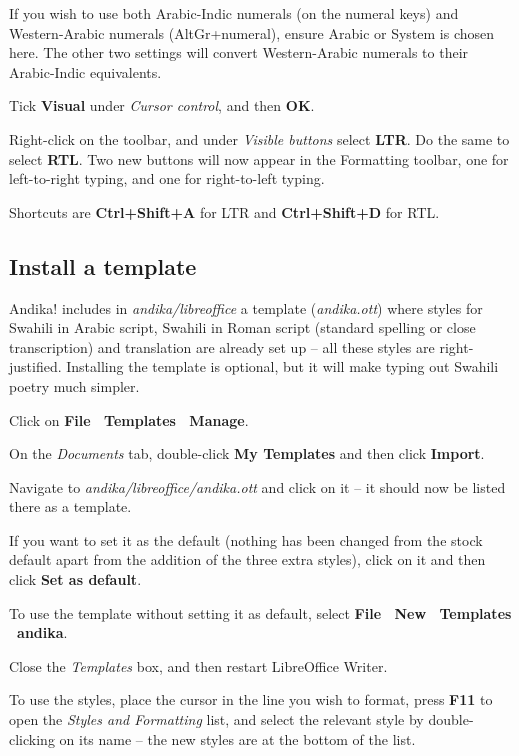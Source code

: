 If you wish to use both Arabic-Indic numerals (on the numeral keys) and Western-Arabic numerals (AltGr+numeral), ensure Arabic or System is chosen here. The other two settings will convert Western-Arabic numerals to their Arabic-Indic equivalents.

Tick \textbf{Visual} under \textit{Cursor control}, and then \textbf{OK}.

Right-click on the toolbar, and under \textit{Visible buttons} select \textbf{LTR}.  Do the same to select \textbf{RTL}.  Two new buttons will now appear in the Formatting toolbar, one for left-to-right typing, and one for right-to-left typing.

Shortcuts are \textbf{Ctrl+Shift+A} for LTR and \textbf{Ctrl+Shift+D} for RTL.

\subsection{Install a template}

Andika! includes in \textit{andika/libreoffice} a template (\textit{andika.ott}) where styles for Swahili in Arabic script, Swahili in Roman script (standard spelling or close transcription) and translation are already set up -- all these styles are right-justified.  Installing the template is optional, but it will make typing out Swahili poetry much simpler.

Click on \textbf{File \textrightarrow\ Templates \textrightarrow\ Manage}.

On the \textit{Documents} tab, double-click \textbf{My Templates} and then click \textbf{Import}.

Navigate to \textit{andika/libreoffice/andika.ott} and click on it -- it should now be listed there as a template.

If you want to set it as the default (nothing has been changed from the stock default apart from the addition of the three extra styles), click on it and then click \textbf{Set as default}.

To use the template without setting it as default, select \textbf{File \textrightarrow\ New \textrightarrow\ Templates \textrightarrow\ andika}.

Close the \textit{Templates} box, and then restart LibreOffice Writer.

To use the styles, place the cursor in the line you wish to format, press \textbf{F11} to open the \textit{Styles and Formatting} list, and select the relevant style by double-clicking on its name -- the new styles are at the bottom of the list.

